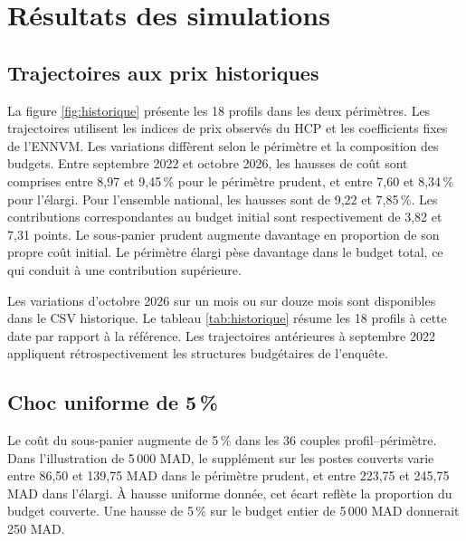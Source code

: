 \chapter{Résultats des simulations}
\section{Trajectoires aux prix historiques}
La figure \ref{fig:historique} présente les 18 profils dans les deux périmètres. Les trajectoires utilisent les indices de prix observés du HCP et les coefficients fixes de l'ENNVM. Les variations diffèrent selon le périmètre et la composition des budgets. Entre septembre 2022 et octobre 2026, les hausses de coût sont comprises entre 8,97 et 9,45\,\% pour le périmètre prudent, et entre 7,60 et 8,34\,\% pour l'élargi. Pour l'ensemble national, les hausses sont de 9,22 et 7,85\,\%. Les contributions correspondantes au budget initial sont respectivement de 3,82 et 7,31 points. Le sous-panier prudent augmente davantage en proportion de son propre coût initial. Le périmètre élargi pèse davantage dans le budget total, ce qui conduit à une contribution supérieure.

Les variations d'octobre 2026 sur un mois ou sur douze mois sont disponibles dans le CSV historique. Le tableau \ref{tab:historique} résume les 18 profils à cette date par rapport à la référence. Les trajectoires antérieures à septembre 2022 appliquent rétrospectivement les structures budgétaires de l'enquête.
\clearpage


\section{Choc uniforme de \texorpdfstring{5\,\%}{5 \%}}
Le coût du sous-panier augmente de 5\,\% dans les 36 couples profil--périmètre. Dans l'illustration de 5\,000 MAD, le supplément sur les postes couverts varie entre 86,50 et 139,75 MAD dans le périmètre prudent, et entre 223,75 et 245,75 MAD dans l'élargi. À hausse uniforme donnée, cet écart reflète la proportion du budget couverte. Une hausse de 5\,\% sur le budget entier de 5\,000 MAD donnerait 250 MAD.

